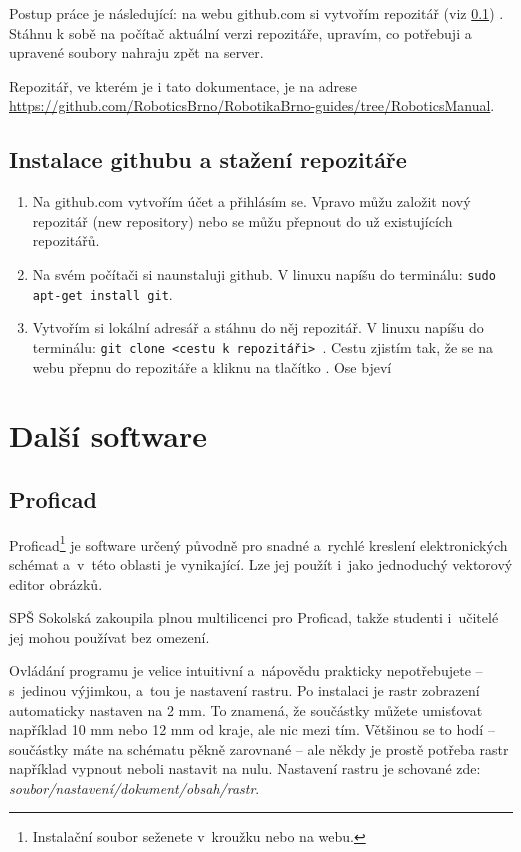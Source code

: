 Postup práce je následující: na webu github.com si vytvořím repozitář (viz \ref{instal_github}) . Stáhnu k sobě na počítač aktuální verzi repozitáře, upravím, co potřebuji a upravené soubory nahraju zpět na server. 

Repozitář, ve kterém je i tato dokumentace, je na adrese 
\url{https://github.com/RoboticsBrno/RobotikaBrno-guides/tree/RoboticsManual}.  


\subsection{Instalace githubu a stažení repozitáře} \label{instal_github}

\begin{enumerate}
	\item Na github.com vytvořím účet a přihlásím se. Vpravo můžu založit nový repozitář (new repository) nebo se můžu přepnout do už existujících repozitářů. 
	
	\item Na svém počítači si naunstaluji github. V linuxu napíšu do terminálu: {\tt sudo apt-get install git}.  
	
	\item Vytvořím si lokální adresář a stáhnu do něj repozitář. V linuxu napíšu do terminálu: {\tt git clone <cestu k repozitáři> }. 
	Cestu zjistím tak, že se na webu přepnu do repozitáře a kliknu na tlačítko . Ose bjeví 
\end{enumerate}


 
\section{Další software}



\subsection{Proficad}

Proficad\footnote{Instalační soubor seženete v~kroužku nebo na webu.} 
je software určený původně pro snadné a~rychlé kreslení elektronických schémat a~v~této oblasti je vynikající. 
Lze jej použít i~jako jednoduchý vektorový editor obrázků. 

SPŠ Sokolská zakoupila plnou multilicenci pro Proficad, takže studenti i~učitelé jej mohou používat bez omezení. 

Ovládání programu je velice intuitivní a~nápovědu prakticky nepotřebujete -- s~jedinou výjimkou, a~tou je nastavení rastru. 
Po instalaci je rastr zobrazení automaticky nastaven na 2 mm. To znamená, že součástky 
můžete umisťovat například 10 mm nebo 12 mm od kraje, ale nic mezi tím. 
Většinou se to hodí -- součástky máte na schématu pěkně zarovnané -- ale 
někdy je prostě potřeba rastr například vypnout neboli nastavit na nulu. 
Nastavení rastru je schované zde:  {\it soubor/nastavení/dokument/obsah/rastr}.

